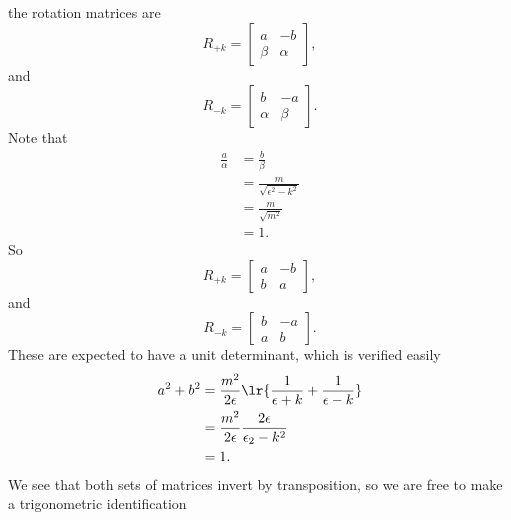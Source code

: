 %
the rotation matrices are
%
\begin{equation}\label{eqn:gradQuantumProblemSet4Problem3:320}
R_{+k}
=
\begin{bmatrix}
a & - b \\
\beta & \alpha
\end{bmatrix},
\end{equation}
%
and
\begin{equation}\label{eqn:gradQuantumProblemSet4Problem3:340}
R_{-k}
=
\begin{bmatrix}
b & -a \\
\alpha & \beta
\end{bmatrix}.
\end{equation}
%
Note that
\begin{equation}\label{eqn:gradQuantumProblemSet4Problem3:360}
\begin{aligned}
\frac{a}{\alpha} &= \frac{b}{\beta} \\
&= \frac{m}{\sqrt{\epsilon^2 - k^2}}  \\
&= \frac{m}{\sqrt{m^2}}  \\
&= 1.
\end{aligned}
\end{equation}
%
So
\begin{equation}\label{eqn:gradQuantumProblemSet4Problem3:380}
R_{+k}
=
\begin{bmatrix}
a & - b \\
b & a
\end{bmatrix},
\end{equation}
%
and
\begin{equation}\label{eqn:gradQuantumProblemSet4Problem3:400}
R_{-k}
=
\begin{bmatrix}
b & -a \\
a & b
\end{bmatrix}.
\end{equation}
%
These are expected to have a unit determinant, which is verified easily
%
\begin{equation}\label{eqn:gradQuantumProblemSet4Problem3:420}
\begin{aligned}
a^2 + b^2
&=
\frac{m^2}{2 \epsilon}
\lr{
\frac{1}{\epsilon + k}
+
\frac{1}{\epsilon - k}
}
\\ &=
\frac{m^2}{2 \epsilon}
\frac{2 \epsilon}{\epsilon_2 - k^2}
\\ &= 1.
\end{aligned}
\end{equation}
%
We see that both sets of matrices invert by transposition, so we are free to make a trigonometric identification
